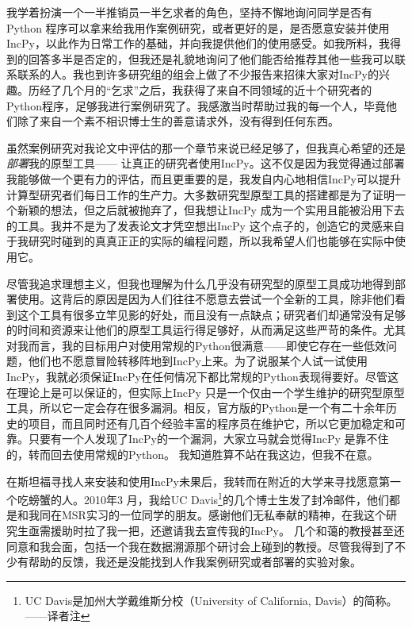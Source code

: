 \documentclass[12pt,UTF8,nofonts]{book}
\begin{document}
我学着扮演一个一半推销员一半乞求者的角色，坚持不懈地询问同学是否有Python 程序可以拿来给我用作案例研究，或者更好的是，是否愿意安装并使用IncPy，以此作为日常工作的基础，并向我提供他们的使用感受。如我所料，我得到的回答多半是否定的，但我还是礼貌地询问了他们能否给推荐其他一些我可以联系联系的人。我也到许多研究组的组会上做了不少报告来招徕大家对IncPy的兴趣。历经了几个月的“乞求”之后，我获得了来自不同领域的近十个研究者的Python程序，足够我进行案例研究了。我感激当时帮助过我的每一个人，毕竟他们除了来自一个素不相识博士生的善意请求外，没有得到任何东西。

\breakline

虽然案例研究对我论文中评估的那一个章节来说已经足够了，但我真心希望的还是\emph{部署}我的原型工具—— 让真正的研究者使用IncPy。这不仅是因为我觉得通过部署我能够做一个更有力的评估，而且更重要的是，我发自内心地相信IncPy可以提升计算型研究者们每日工作的生产力。大多数研究型原型工具的搭建都是为了证明一个新颖的想法，但之后就被抛弃了，但我想让IncPy 成为一个实用且能被沿用下去的工具。我并不是为了发表论文才凭空想出IncPy 这个点子的，创造它的灵感来自于我研究时碰到的真真正正的实际的编程问题，所以我希望人们也能够在实际中使用它。

尽管我追求理想主义，但我也理解为什么几乎没有研究型的原型工具成功地得到部署使用。这背后的原因是因为人们往往不愿意去尝试一个全新的工具，除非他们看到这个工具有很多立竿见影的好处，而且没有一点缺点；研究者们却通常没有足够的时间和资源来让他们的原型工具运行得足够好，从而满足这些严苛的条件。尤其对我而言，我的目标用户对使用常规的Python很满意——即使它存在一些低效问题，他们也不愿意冒险转移阵地到IncPy上来。为了说服某个人试一试使用IncPy，我就必须保证IncPy在任何情况下都比常规的Python表现得要好。尽管这在理论上是可以保证的，但实际上IncPy 只是一个仅由一个学生维护的研究型原型工具，所以它一定会存在很多漏洞。相反，官方版的Python是一个有二十余年历史的项目，而且同时还有几百个经验丰富的程序员在维护它，所以它更加稳定和可靠。只要有一个人发现了IncPy的一个漏洞，大家立马就会觉得IncPy 是靠不住的，转而回去使用常规的Python。 我知道胜算不站在我这边，但我不在意。

在斯坦福寻找人来安装和使用IncPy未果后，我转而在附近的大学来寻找愿意第一个吃螃蟹的人。2010年3 月，我给UC Davis\footnote{UC Davis是加州大学戴维斯分校（University of California, Davis）的简称。——译者注}的几个博士生发了封冷邮件，他们都是和我同在MSR实习的一位同学的朋友。感谢他们无私奉献的精神，在我这个研究生亟需援助时拉了我一把，还邀请我去宣传我的IncPy。 几个和蔼的教授甚至还同意和我会面，包括一个我在数据溯源那个研讨会上碰到的教授。尽管我得到了不少有帮助的反馈，我还是没能找到人作我案例研究或者部署的实验对象。
\end{document}
